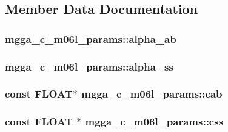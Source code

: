 \subsection{Member Data Documentation}
\hypertarget{structmgga__c__m06l__params_aac6895f9eb8e9e27d2b65fa36cec7bcb}{
\subsubsection[{alpha\-\_\-ab}]{ mgga\-\_\-c\-\_\-m06l\-\_\-params\-::alpha\-\_\-ab}}\label{structmgga__c__m06l__params_aac6895f9eb8e9e27d2b65fa36cec7bcb}
\hypertarget{structmgga__c__m06l__params_a56cbf1e82c93e76eaf30427666cd006d}{
\subsubsection[{alpha\-\_\-ss}]{ mgga\-\_\-c\-\_\-m06l\-\_\-params\-::alpha\-\_\-ss}}\label{structmgga__c__m06l__params_a56cbf1e82c93e76eaf30427666cd006d}
\hypertarget{structmgga__c__m06l__params_aeaf3b17fcee7815ed924c9f8412419fb}{
\subsubsection[{cab}]{\setlength{\rightskip}{0pt plus 5cm}const {\bf F\-L\-O\-A\-T}$\ast$ mgga\-\_\-c\-\_\-m06l\-\_\-params\-::cab}}\label{structmgga__c__m06l__params_aeaf3b17fcee7815ed924c9f8412419fb}
\hypertarget{structmgga__c__m06l__params_a58099ec3cdd0c2fbf2e71e1bd90434e7}{
\subsubsection[{css}]{\setlength{\rightskip}{0pt plus 5cm}const {\bf F\-L\-O\-A\-T} $\ast$ mgga\-\_\-c\-\_\-m06l\-\_\-params\-::css}}\label{structmgga__c__m06l__params_a58099ec3cdd0c2fbf2e71e1bd90434e7}
